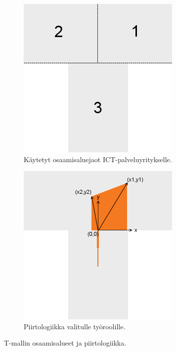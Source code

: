 \documentclass[a4paper,finnish,12pt]{article}
\begin{document}
\begin{figure}[t]
	\centering
	\begin{subfigure}[t]{0.45\textwidth}
		\includegraphics[width=\textwidth]{T_areas.png}
		\caption{Käytetyt osaamisaluejaot ICT-palveluyritykselle.}
		\label{fig:Tareas}
	\end{subfigure}
	\hfill
	\begin{subfigure}[t]{0.45\textwidth}
		\includegraphics[width=\textwidth]{T_drawing_logics.png}
		\caption{Piirtologiikka valitulle työroolille.}
		\label{fig:Tlogics}
	\end{subfigure}
	\caption{T-mallin osaamisalueet ja piirtologiikka.}
\end{figure}
\end{document}
